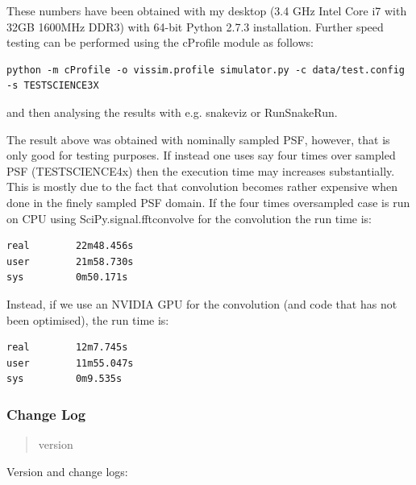 \documentclass[a4paper,11pt,english]{sphinxmanual}
\begin{document}
These numbers have been obtained with my desktop (3.4 GHz Intel Core i7 with 32GB 1600MHz DDR3) with
64-bit Python 2.7.3 installation. Further speed testing can be performed using the cProfile module
as follows:

\begin{Verbatim}[commandchars=\\\{\}]
python -m cProfile -o vissim.profile simulator.py -c data/test.config -s TESTSCIENCE3X
\end{Verbatim}

and then analysing the results with e.g. snakeviz or RunSnakeRun.

The result above was obtained with nominally sampled PSF, however, that is only good for
testing purposes. If instead one uses say four times over sampled PSF (TESTSCIENCE4x) then the
execution time may increases substantially. This is mostly due to the fact that convolution
becomes rather expensive when done in the finely sampled PSF domain. If the four times oversampled case
is run on CPU using SciPy.signal.fftconvolve for the convolution the run time is:

\begin{Verbatim}[commandchars=\\\{\}]
real        22m48.456s
user        21m58.730s
sys         0m50.171s
\end{Verbatim}

Instead, if we use an NVIDIA GPU for the convolution (and code that has not been optimised), the run time is:

\begin{Verbatim}[commandchars=\\\{\}]
real        12m7.745s
user        11m55.047s
sys         0m9.535s
\end{Verbatim}


\subsubsection{Change Log}
\label{simulator:change-log}\begin{quote}\begin{description}
\item[{version}] 

\end{description}\end{quote}

Version and change logs:
\end{document}
